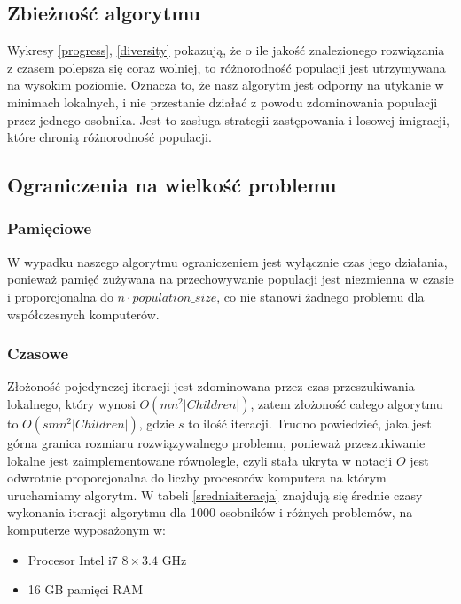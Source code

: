 \documentclass[11pt, a4wide]{article}
\begin{document}
\subsection{Zbieżność algorytmu}
Wykresy \ref{progress}, \ref{diversity} pokazują, że o ile jakość znalezionego rozwiązania z czasem polepsza się 
coraz wolniej, to różnorodność populacji jest utrzymywana na wysokim poziomie. Oznacza to, że nasz algorytm jest odporny na utykanie
w minimach lokalnych, i nie przestanie działać z powodu zdominowania populacji przez jednego osobnika. Jest to
zasługa strategii zastępowania i losowej imigracji, które chronią różnorodność populacji.

\subsection{Ograniczenia na wielkość problemu}
\subsubsection{Pamięciowe}
W wypadku naszego algorytmu ograniczeniem jest wyłącznie czas jego działania, ponieważ
pamięć zużywana na przechowywanie populacji jest niezmienna w czasie i proporcjonalna do
$n \cdot population\_size$, co nie stanowi żadnego problemu dla współczesnych komputerów.
\subsubsection{Czasowe}
Złożoność pojedynczej iteracji jest zdominowana przez czas przeszukiwania lokalnego, który wynosi
$O(mn^2|Children|)$, zatem złożoność całego algorytmu to $O(smn^2|Children|)$, gdzie $s$ to ilość iteracji.
Trudno powiedzieć, jaka jest górna granica rozmiaru rozwiązywalnego problemu, ponieważ przeszukiwanie 
lokalne jest zaimplementowane równolegle, czyli stała ukryta w notacji $O$ jest odwrotnie proporcjonalna
do liczby procesorów komputera na którym uruchamiamy algorytm. W tabeli \ref{sredniaiteracja} znajdują się 
średnie czasy wykonania iteracji algorytmu dla 1000 osobników i różnych problemów, na komputerze wyposażonym w:
\begin{itemize}
  \item Procesor Intel i7 $8 \times \text{3.4 GHz}$
  \item 16 GB pamięci RAM
\end{itemize}
\end{document}
